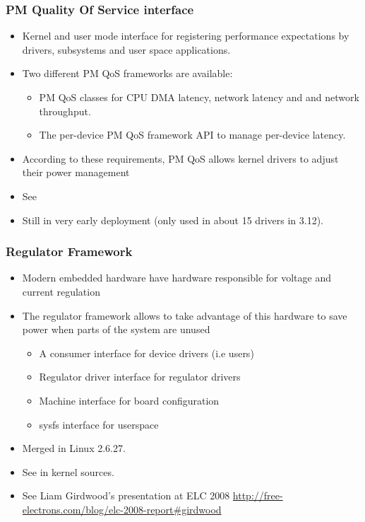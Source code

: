 \begin{frame}
  \frametitle{PM Quality Of Service interface}
  \begin{itemize}
  \item Kernel and user mode interface for registering
        performance expectations by drivers, subsystems and user space
        applications.
  \item Two different PM QoS frameworks are available:
    \begin{itemize}
       \item PM QoS classes for CPU DMA latency, network latency and 
             and network throughput.
       \item The per-device PM QoS framework API to manage per-device
	     latency.
    \end{itemize}
  \item According to these requirements, PM QoS allows kernel drivers
        to adjust their power management
  \item See 
  \item Still in very early deployment (only used in about 15 drivers in
        3.12).
  \end{itemize}
\end{frame}

\begin{frame}
  \frametitle{Regulator Framework}
  \begin{itemize}
  \item Modern embedded hardware have hardware responsible for voltage
    and current regulation
  \item The regulator framework allows to take advantage of this
    hardware to save power when parts of the system are unused
    \begin{itemize}
    \item A consumer interface for device drivers (i.e users)
    \item Regulator driver interface for regulator drivers
    \item Machine interface for board configuration
    \item sysfs interface for userspace
    \end{itemize}
  \item Merged in Linux 2.6.27.
  \item See  in kernel sources.
  \item See Liam Girdwood's presentation at ELC 2008
    \url{http://free-electrons.com/blog/elc-2008-report\#girdwood}
  \end{itemize}
\end{frame}

